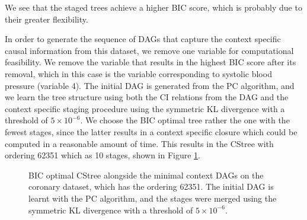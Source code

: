 \documentclass{tufte-book}
\begin{document}
We see that the staged trees achieve a higher BIC score, which is probably due to their greater flexibility.


In order to generate the sequence of DAGs that capture the context specific causal information from this dataset, we remove one variable for computational feasibility. We remove the variable that results in the highest BIC score after its removal, which in this case is the variable corresponding to systolic blood pressure (variable 4). The initial DAG is generated from the PC algorithm, and we learn the tree structure using both the CI relations from the DAG and the context specific staging procedure using the symmetric KL divergence with a threshold of \(5\times 10^{-6}\). We choose the BIC optimal tree rather the one with the fewest stages, since the latter results in a context specific closure which could be computed in a reasonable amount of time.  This results in the CStree with ordering 62351 which as 10 stages, shown in Figure \ref{fig:coronary_wout4}. 


\begin{figure}[!h]\label{fig:coronary_wout4}
   \begin{floatrow}
%
\caption{BIC optimal CStree alongside the minimal context DAGs on the coronary dataset, which has the ordering 62351. The initial DAG is learnt with the PC algorithm, and the stages were merged using the symmetric KL divergence with a threshold of $5\times 10^{-6}$. }
        
   \end{floatrow}
\end{figure}





 \newpage 
\end{document}
